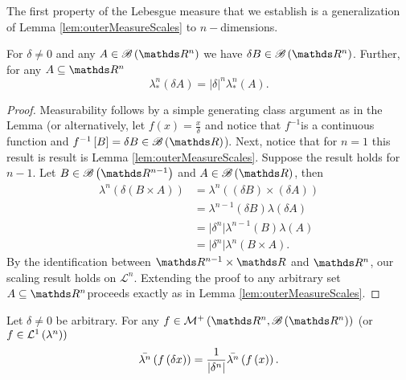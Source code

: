 The first property of the Lebesgue measure that we establish is a
generalization of Lemma \ref{lem:outerMeasureScales} to $n-$dimensions.
\begin{prop}
\label{prop:outerMeasureScalesNDim}For $\delta\neq0$ and any $A\in\borel\left(\R^{n}\right)$
we have $\delta B\in\borel\left(\R^{n}\right)$. Further, for any
$A\subseteq\R^{n}$
\[
\lambda_{*}^{n}\left(\delta A\right)=\lvert\delta\rvert^{n}\lambda_{*}^{n}\left(A\right).
\]
\end{prop}

\begin{proof}
Measurability follows by a simple generating class argument as in
the Lemma (or alternatively, let $f\left(x\right)=\frac{x}{\delta}$
and notice that $f^{-1}$is a continuous function and $f^{-1}\left[B\right]=\delta B\in\borel\left(\R\right)$).
Next, notice that for $n=1$ this result is result is Lemma \ref{lem:outerMeasureScales}.
Suppose the result holds for $n-1$. Let $B\in\borel\left(\R^{n-1}\right)$
and $A\in\borel\left(\R\right)$, then 
\begin{align*}
\lambda^{n}\left(\delta\left(B\times A\right)\right) & =\lambda^{n}\left(\left(\delta B\right)\times\left(\delta A\right)\right)\\
 & =\lambda^{n-1}\left(\delta B\right)\lambda\left(\delta A\right)\\
 & =\lvert\delta^{n}\rvert\lambda^{n-1}\left(B\right)\lambda\left(A\right)\\
 & =\lvert\delta^{n}\rvert\lambda^{n}\left(B\times A\right).
\end{align*}
By the identification between $\R^{n-1}\times\R$ and $\R^{n}$, our
scaling result holds on $\mathcal{L}^{n}$. Extending the proof to
any arbitrary set $A\subseteq\R^{n}$proceeds exactly as in Lemma
\ref{lem:outerMeasureScales}.
\end{proof}
\begin{cor}
\label{cor:dilationIntegral}Let $\delta\neq0$ be arbitrary. For
any $f\in\mathcal{M}^{+}\left(\R^{n},\borel\left(\R^{n}\right)\right)$
(or $f\in\mathcal{L}^{1}\left(\lambda^{n}\right))$
\[
\bar{\lambda^{n}}\left(f\left(\delta x\right)\right)=\frac{1}{\lvert\delta^{n}\rvert}\bar{\lambda^{n}}\left(f\left(x\right)\right).
\]
\end{cor}

